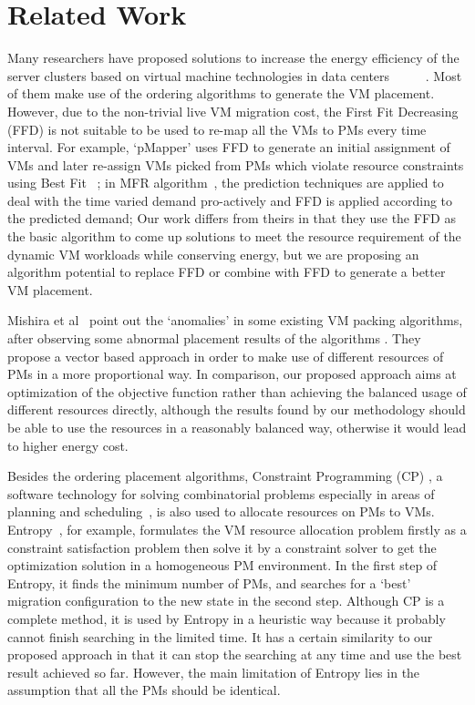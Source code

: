 \documentclass[10pt, conference, compsocconf]{IEEEtran}
\begin{document}
\section{Related Work}

Many researchers have proposed solutions to increase the energy efficiency of
the server clusters based on virtual machine technologies in data centers
~\cite{verma08}~\cite{verma09}~\cite{wood09}~\cite{kusic09}~\cite{stillwell10}.
Most of them make use of the ordering algorithms to generate the VM
placement. However, due to the non-trivial live VM migration cost, the First
Fit Decreasing (FFD) is not suitable to be used to re-map all the VMs to PMs every time interval.
For example, `pMapper' uses FFD to generate an initial assignment of VMs and later re-assign
VMs picked from PMs which violate resource constraints using Best Fit
~\cite{verma08}; in MFR algorithm~\cite{Bobroff07}, the prediction techniques are applied to deal
with the time varied demand pro-actively and FFD is applied according to the
predicted demand; Our work differs from theirs in that they use the FFD as
the basic algorithm to come up solutions to meet the resource requirement of the
dynamic VM workloads while conserving energy, but we are proposing an algorithm potential
to replace FFD or combine with FFD to generate a better VM placement.

Mishira et al~\cite{mashira11} point out the `anomalies' in some existing VM
packing algorithms, after observing some abnormal placement results of the
algorithms . They propose a vector based approach in order to
make use of different resources of PMs in a more proportional way. In comparison, our proposed approach aims at
optimization of the objective function rather than achieving the balanced usage
of different resources directly, although the results found by our methodology should be
able to use the resources in a reasonably balanced way, otherwise it would lead
to higher energy cost.

Besides the ordering placement algorithms, Constraint Programming (CP) , a
software technology for solving combinatorial problems especially in areas of
planning and scheduling~\cite{nakada09}, is also used to allocate resources on
PMs to VMs.
Entropy~\cite{hermenier09}, for example, formulates the VM resource allocation
problem firstly as a constraint satisfaction problem then solve it by a
constraint solver to get the optimization solution in a homogeneous PM
environment. In the first step of Entropy, it finds the minimum number of PMs,
and searches for a `best' migration configuration to the new state in the second
step.
Although CP is a complete method, it is used by Entropy in a heuristic way
because it probably cannot finish searching in the limited time. It has a
certain similarity to our proposed approach in that it can stop the searching at
any time and use the best result achieved so far. However, the main limitation
of Entropy lies in the assumption that all the PMs should be identical.
\end{document}
